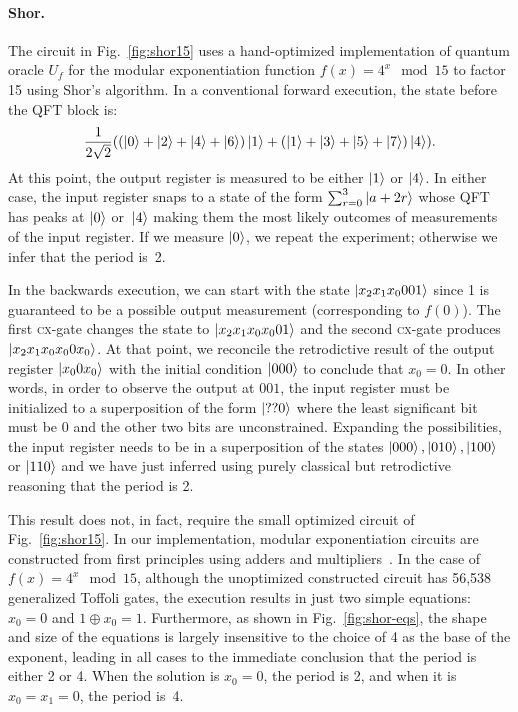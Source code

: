 \documentclass[sigplan,screen]{acmart}
\newcommand{\cx}{\textsc{cx}}
\theoremstyle{definition}
\begin{document}
\paragraph*{Shor.}
The circuit in Fig.~\ref{fig:shor15} uses a hand-optimized
implementation of quantum oracle $U_f$ for the modular exponentiation
function $f(x) = 4^x \mod{15}$ to factor 15 using Shor's algorithm.
In a conventional forward execution, the state before the QFT block
is:
\[
\frac{1}{2\sqrt{2}} (
  (\ket{0} + \ket{2} + \ket{4} + \ket{6}) \ket{1} +
  (\ket{1} + \ket{3} + \ket{5} + \ket{7}) \ket{4}
  ) .
\]
At this point, the output register is measured to be either $\ket{1}$ or
$\ket{4}$. In either case, the input register snaps to a state
of the form $\sum_{r=0}^3 \ket{a+2r}$ whose QFT has peaks at $\ket{0}$
or~$\ket{4}$ making them the most likely outcomes of measurements of
the input register. If we measure $\ket{0}$, we repeat the
experiment; otherwise we infer that the period is~2.

In the backwards execution, we can start with the state
$\ket{x_2x_1x_0001}$ since 1 is guaranteed to be a possible output
measurement (corresponding to $f(0)$). The first \cx-gate changes the
state to $\ket{x_2x_1x_0x_001}$ and the second \cx-gate produces
$\ket{x_2x_1x_0x_00x_0}$. At that point, we reconcile the retrodictive
result of the output register $\ket{x_00x_0}$ with the initial
condition $\ket{000}$ to conclude that $x_0=0$. In other words, in
order to observe the output at $001$, the input register must
be initialized to a superposition of the form $\ket{??0}$ where the
least significant bit must be 0 and the other two bits are
unconstrained. Expanding the possibilities, the input register needs
to be in a superposition of the states
$\ket{000}, \ket{010}, \ket{100}$ or $\ket{110}$ and we have just
inferred using purely classical but retrodictive reasoning that the
period is 2.

This result does not, in fact, require the small optimized circuit of
Fig.~\ref{fig:shor15}. In our implementation, modular exponentiation
circuits are constructed from first principles using adders and
multipliers~\cite{PhysRevA.54.147}. In the case of $f(x) = 4^x
\mod{15}$, although the unoptimized constructed circuit has 56,538
generalized Toffoli gates,
the execution results in just two simple equations: $x_0 = 0$ and $1
\oplus x_0 = 1$. Furthermore, as shown in Fig.~\ref{fig:shor-eqs}, the
shape and size of the equations is largely insensitive to the choice
of 4 as the base of the exponent, leading in all cases to the
immediate conclusion that the period is either 2 or 4. When the
solution is $x_0=0$, the period is 2, and when it is $x_0=x_1=0$, the
period is~4.
\end{document}
